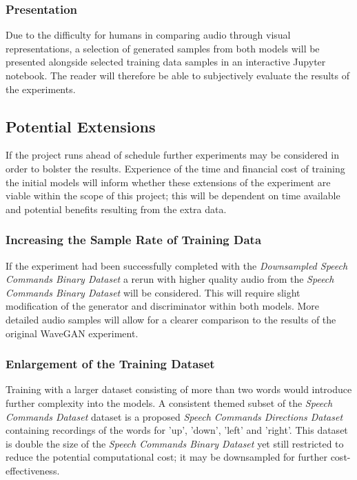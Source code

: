 \documentclass[a4paper, dvipsnames, titlepage]{article}
\begin{document}
\subsubsection{Presentation}

Due to the difficulty for humans in comparing audio through visual representations, a selection of generated samples from both models will be presented alongside selected training data samples in an interactive Jupyter notebook.
The reader will therefore be able to subjectively evaluate the results of the experiments.

\subsection{Potential Extensions}

If the project runs ahead of schedule further experiments may be considered in order to bolster the results.
Experience of the time and financial cost of training the initial models will inform whether these extensions of the experiment are viable within the scope of this project; this will be dependent on time available and potential benefits resulting from the extra data.

\subsubsection{Increasing the Sample Rate of Training Data}

If the experiment had been successfully completed with the \textit{Downsampled Speech Commands Binary Dataset} a rerun with higher quality audio from the \textit{Speech Commands Binary Dataset} will be considered.
This will require slight modification of the generator and discriminator within both models.
More detailed audio samples will allow for a clearer comparison to the results of the original WaveGAN experiment.

\subsubsection{Enlargement of the Training Dataset}

Training with a larger dataset consisting of more than two words would introduce further complexity into the models.
A consistent themed subset of the \textit{Speech Commands Dataset} dataset is a proposed \textit{Speech Commands Directions Dataset} containing recordings of the words for 'up', 'down', 'left' and 'right'.
This dataset is double the size of the \textit{Speech Commands Binary Dataset} yet still restricted to reduce the potential computational cost; it may be downsampled for further cost-effectiveness.
\end{document}
